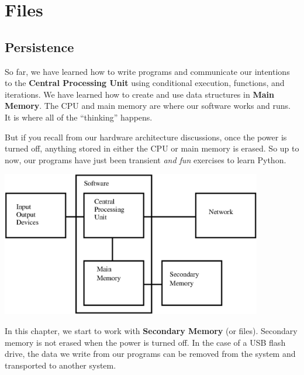
\chapter{Files}



\section{Persistence}


So far, we have learned how to write programs and communicate 
our intentions to the {\bf Central Processing Unit} using conditional
execution, functions, and iterations.  We have learned how to 
create and use data structures in {\bf Main Memory}.  The CPU 
and main memory are where our software works and runs.  It is where 
all of the ``thinking'' happens.  

But if you recall from our hardware architecture discussions,
once the power is turned off, anything stored in either
the CPU or main memory is erased.  So up to now, our
programs have just been transient \textit{and fun} exercises to learn Python.

\beforefig
\centerline{\includegraphics[height=2.50in]{figs2/arch3.eps}}
\afterfig

In this chapter, we start to work with {\bf Secondary Memory} 
(or files).
Secondary memory is not erased when the power is turned off.  
In the case of a USB flash drive, the
data we write from our programs can be removed from the 
system and transported to another system.

